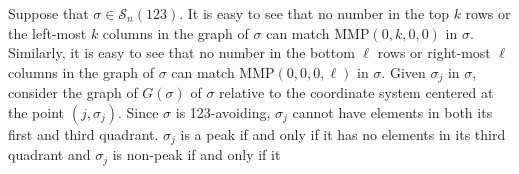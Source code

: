 \documentclass[
final,nomarks
]{dmtcs-episciences}
\newcommand{\Sn}[1]{\mathcal{S}_{#1}}
\newcommand{\MMP}{\mathrm{MMP}}
\begin{document}
Suppose that \begin{math}\sigma \in \Sn{n}(123)\end{math}. 
It is easy to see that no number in the top \begin{math}k\end{math} rows or the left-most \begin{math}k\end{math} columns in the graph of \begin{math}\sigma\end{math} can match \begin{math}\MMP(0,k,0,0)\end{math} 
in \begin{math}\sigma\end{math}. Similarly, it  is easy to see that no number in the bottom \begin{math}\ell\end{math} rows or right-most \begin{math}\ell\end{math} columns 
in the graph of \begin{math}\sigma\end{math} can match \begin{math}\MMP(0,0,0,\ell)\end{math} in \begin{math}\sigma\end{math}. 
Given \begin{math}\sigma_j\end{math}  in \begin{math}\sigma\end{math}, consider the graph of \begin{math}G(\sigma)\end{math} of \begin{math}\sigma\end{math} relative to the coordinate 
system centered at the point \begin{math}(j,\sigma_j)\end{math}.  Since \begin{math}\sigma\end{math} is 123-avoiding, \begin{math}\sigma_j\end{math} cannot 
have elements in both its first and third quadrant. \begin{math}\sigma_j\end{math} is a peak if and only if 
it has no elements in its third quadrant and \begin{math}\sigma_j\end{math} is non-peak if and only if it 
\end{document}
